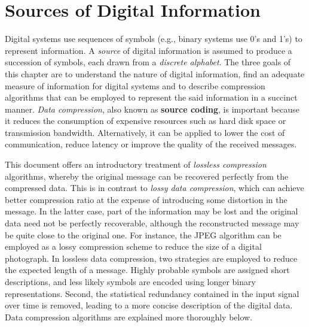 %

\chapter{Sources of Digital Information}

Digital systems use sequences of symbols (e.g., binary systems use 0's and 1's) to represent information.
A \emph{source} of digital information is assumed to produce a succession of symbols, each drawn from a \emph{discrete alphabet}.
The three goals of this chapter are to understand the nature of digital information, find an adequate measure of information for digital systems and to describe compression algorithms that can be employed to represent the said information in a succinct manner.
\emph{Data compression}, also known as \textbf{source coding}, is important because it reduces the consumption of expensive resources such as hard disk space or transmission bandwidth.
Alternatively, it can be applied to lower the cost of communication, reduce latency or improve the quality of the received messages.

This document offers an introductory treatment of \emph{lossless compression} algorithms, whereby the original message can be recovered perfectly from the compressed data.
This is in contrast to \emph{lossy data compression}, which can achieve better compression ratio at the expense of introducing some distortion in the message.
In the latter case, part of the information may be lost and the original data need not be perfectly recoverable, although the reconstructed message may be quite close to the original one.
For instance, the JPEG algorithm can be employed as a lossy compression scheme to reduce the size of a digital photograph.
In lossless data compression, two strategies are employed to reduce the expected length of a message.
Highly probable symbols are assigned short descriptions, and less likely symbols are encoded using longer binary representations.
Second, the statistical redundancy contained in the input signal over time is removed, leading to a more concise description of the digital data.
Data compression algorithms are explained more thoroughly below.

